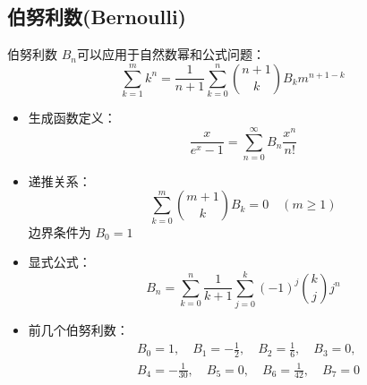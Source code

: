 \subsection{伯努利数(Bernoulli)}
伯努利数 $B_n$可以应用于自然数幂和公式问题：
    $$\displaystyle \sum_{k=1}^{m} k^n = \frac{1}{n+1} \sum_{k=0}^{n} \binom{n+1}{k} B_k m^{n+1-k}$$

\begin{itemize}
    \item 生成函数定义：
        $$\frac{x}{e^x-1} = \sum_{n=0}^{\infty} B_n \frac{x^n}{n!}$$
    
    \item 递推关系：
        $$\sum_{k=0}^{m} \binom{m+1}{k} B_k = 0 \quad (m \geq 1)$$
        边界条件为 $B_0 = 1$
    
    \item 显式公式：
        $$B_n = \sum_{k=0}^{n} \frac{1}{k+1} \sum_{j=0}^{k} (-1)^j \binom{k}{j} j^n$$
    
    \item 前几个伯努利数：
        \begin{align*}
        & B_0 = 1, \quad B_1 = -\frac{1}{2}, \quad B_2 = \frac{1}{6}, \quad B_3 = 0, \\
        & B_4 = -\frac{1}{30}, \quad B_5 = 0, \quad B_6 = \frac{1}{42}, \quad B_7 = 0
        \end{align*}
\end{itemize}


